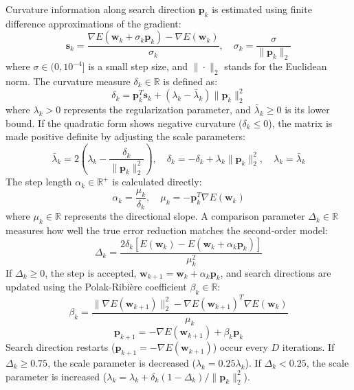 \documentclass[conference,10pt]{IEEEtran}
\begin{document}
Curvature information along search direction $\mathbf{p}_k$ is estimated using finite difference approximations of the gradient:
\begin{equation}
\mathbf{s}_k = \frac{\nabla E(\mathbf{w}_k + \sigma_k \mathbf{p}_k) - \nabla E(\mathbf{w}_k)}{\sigma_k}, \quad \sigma_k = \frac{\sigma}{\|\mathbf{p}_k\|_2}
\end{equation}
where $\sigma \in (0, 10^{-4}]$ is a small step size, and $\|\cdot\|_2$ stands for the Euclidean norm. The curvature measure $\delta_k \in \mathbb{R}$ is defined as:
\begin{equation}
\delta_k = \mathbf{p}_k^T \mathbf{s}_k + (\lambda_k - \bar{\lambda}_k)\|\mathbf{p}_k\|_2^2
\end{equation}
where $\lambda_k > 0$ represents the regularization parameter, and $\bar{\lambda}_k \ge 0$ is its lower bound. If the quadratic form shows negative curvature ($\delta_k \le 0$), the matrix is made positive definite by adjusting the scale parameters:
\begin{equation}
\bar{\lambda}_k = 2\left(\lambda_k - \frac{\delta_k}{\|\mathbf{p}_k\|_2^2}\right), \quad \delta_k = -\delta_k + \lambda_k \|\mathbf{p}_k\|_2^2, \quad \lambda_k = \bar{\lambda}_k
\end{equation}
The step length $\alpha_k \in \mathbb{R}^+$ is calculated directly:
\begin{equation}
\alpha_k = \frac{\mu_k}{\delta_k}, \quad \mu_k = -\mathbf{p}_k^T \nabla E(\mathbf{w}_k)
\end{equation}
where $\mu_k \in \mathbb{R}$ represents the directional slope. A comparison parameter $\Delta_k \in \mathbb{R}$ measures how well the true error reduction matches the second-order model:
\begin{equation}
\Delta_k = \frac{2\delta_k [E(\mathbf{w}_k) - E(\mathbf{w}_k + \alpha_k \mathbf{p}_k)]}{\mu_k^2}
\end{equation}
If $\Delta_k \ge 0$, the step is accepted, $\mathbf{w}_{k+1} = \mathbf{w}_k + \alpha_k \mathbf{p}_k$, and search directions are updated using the Polak-Ribi\`{e}re coefficient $\beta_k \in \mathbb{R}$:
\begin{equation}
\beta_k = \frac{\|\nabla E(\mathbf{w}_{k+1})\|_2^2 - \nabla E(\mathbf{w}_{k+1})^T \nabla E(\mathbf{w}_k)}{\mu_k}
\end{equation}
\begin{equation}
\mathbf{p}_{k+1} = -\nabla E(\mathbf{w}_{k+1}) + \beta_k \mathbf{p}_k
\end{equation}
Search direction restarts ($\mathbf{p}_{k+1} = -\nabla E(\mathbf{w}_{k+1})$) occur every $D$ iterations. If $\Delta_k \ge 0.75$, the scale parameter is decreased ($\lambda_k = 0.25 \lambda_k$). If $\Delta_k < 0.25$, the scale parameter is increased ($\lambda_k = \lambda_k + \delta_k (1 - \Delta_k) / \|\mathbf{p}_k\|_2^2$).
\end{document}
